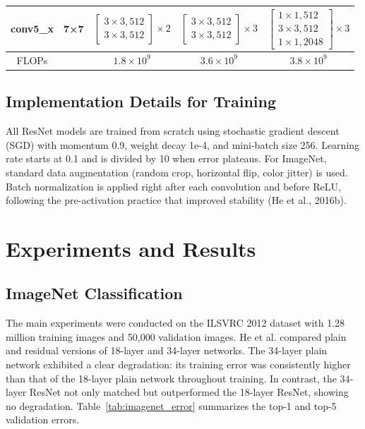 \documentclass[11pt,a4paper]{article}
\begin{document}
\begin{table}[ht]
\begin{tabular}{c|c|c|c|c}
conv5\_x & 7×7 & $\begin{bmatrix} 3\times3, 512 \\ 3\times3, 512 \end{bmatrix} \times 2$ & $\begin{bmatrix} 3\times3, 512 \\ 3\times3, 512 \end{bmatrix} \times 3$ & $\begin{bmatrix} 1\times1, 512 \\ 3\times3, 512 \\ 1\times1, 2048 \end{bmatrix} \times 3$ \\
\midrule
FLOPs & & $1.8\times10^9$ & $3.6\times10^9$ & $3.8\times10^9$ \\
\bottomrule
\end{tabular}
\end{table}

\subsection{Implementation Details for Training}
All ResNet models are trained from scratch using stochastic gradient descent (SGD) with momentum 0.9, weight decay 1e-4, and mini-batch size 256. Learning rate starts at 0.1 and is divided by 10 when error plateaus. For ImageNet, standard data augmentation (random crop, horizontal flip, color jitter) is used. Batch normalization is applied right after each convolution and before ReLU, following the pre-activation practice that improved stability (He et al., 2016b).

\section{Experiments and Results}
\label{sec:experiments}

\subsection{ImageNet Classification}
The main experiments were conducted on the ILSVRC 2012 dataset with 1.28 million training images and 50,000 validation images. He et al. compared plain and residual versions of 18-layer and 34-layer networks. The 34-layer plain network exhibited a clear degradation: its training error was consistently higher than that of the 18-layer plain network throughout training. In contrast, the 34-layer ResNet not only matched but outperformed the 18-layer ResNet, showing no degradation. Table~\ref{tab:imagenet_error} summarizes the top-1 and top-5 validation errors.
\end{document}
